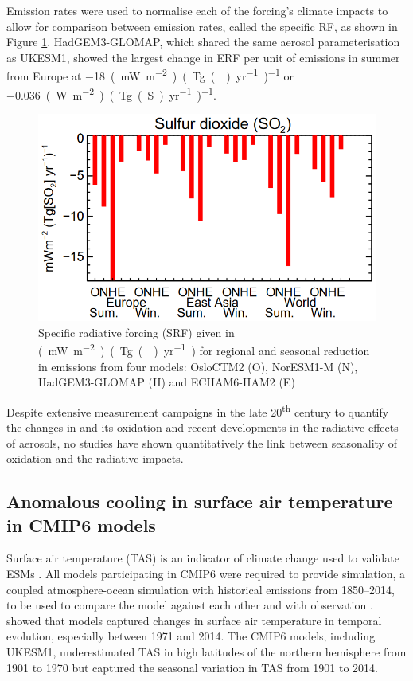 Emission rates were used to normalise each of the forcing's climate impacts to allow for comparison between emission rates, called the specific RF, as shown in Figure \ref{fig:ch4:bellouin2016}. HadGEM3-GLOMAP, which shared the same aerosol parameterisation as UKESM1, showed the largest change in ERF per unit of  emissions in summer from Europe at \qty{-18}{(mW~m^{-2})~(Tg()~yr^{-1})^{-1}} or \qty{-0.036}{(W~m^{-2})~(Tg(S)~yr^{-1})^{-1}}.


\begin{figure}
    \centering
    \includegraphics[width=0.5\linewidth]{Chapter4/Figs/bellouin2016.png}
    \caption[Specific radiative forcing (SRF) reported by \citet{bellouinRegionalSeasonalRadiative2016}]{ Specific radiative forcing (SRF) given in \unit{(mW~m^{-2})~(Tg()~yr^{-1})} for regional and seasonal reduction in  emissions from four models:  OsloCTM2 (O), NorESM1-M (N), HadGEM3-GLOMAP (H) and ECHAM6-HAM2 (E) \citep{bellouinRegionalSeasonalRadiative2016}}
    \label{fig:ch4:bellouin2016}
\end{figure}

Despite extensive measurement campaigns in the late 20\textsuperscript{th} century to quantify the changes in  and its oxidation and recent developments in the radiative effects of aerosols, no studies have shown quantitatively the link between seasonality of oxidation and the radiative impacts.

\subsection{Anomalous cooling in surface air temperature in CMIP6 models}
\label{ch4:sec:pothole}

Surface air temperature (TAS) is an indicator of climate change used to validate ESMs \citep[e.g. ][]{fanGlobalSurfaceAir2020,ipccClimateChange20132014}. All models participating in CMIP6 were required to provide \hist{} simulation, a coupled atmosphere-ocean simulation with historical emissions from 1850--2014, to be used to compare the model against each other and with observation \citep{eyringOverviewCoupledModel2016}. \citet{fanGlobalSurfaceAir2020} showed that models captured changes in surface air temperature in temporal evolution, especially between 1971 and 2014. The CMIP6 models, including UKESM1, underestimated TAS in high latitudes of the northern hemisphere from 1901 to 1970 but captured the seasonal variation in TAS from 1901 to 2014. 

